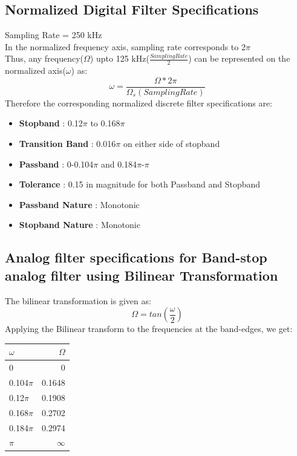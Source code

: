 \documentclass[12pt]{article}
\begin{document}
\subsection{Normalized Digital Filter Specifications}
Sampling Rate = 250 kHz\\
In the normalized frequency axis, sampling rate corresponds to 2$\pi$ \\
Thus, any frequency($\Omega$) upto 125 kHz($\frac{Sampling Rate}{2}$) can be represented on the normalized axis($\omega$) as:
\begin{equation*}
\omega = \frac{\Omega*2\pi}{\Omega _{s}(Sampling Rate)}
\end{equation*}
Therefore the corresponding normalized discrete filter specifications are:
\begin{itemize}
\item \textbf{Stopband} : 0.12$\pi$ to 0.168$\pi$
\item \textbf{Transition Band} : 0.016$\pi$ on either side of stopband
\item \textbf{Passband} : 0-0.104$\pi$ and 0.184$\pi$-$\pi$
\item \textbf{Tolerance} : 0.15 in magnitude for both Passband and Stopband
\item \textbf{Passband Nature} : Monotonic
\item \textbf{Stopband Nature} : Monotonic
\end{itemize}
\subsection{Analog filter specifications for Band-stop analog filter using Bilinear Transformation}
The bilinear transformation is given as:
\begin{equation*}
\Omega = tan\left(\frac{\omega}{2}\right)
\end{equation*}
Applying the Bilinear transform to the frequencies at the band-edges, we get:
\begin{table}[h!]
\centering
\begin{tabular}{|l|r|}\hline
$\omega$ & $\Omega$ \\\hline
0 & 0 \\
0.104$\pi$ & 0.1648 \\             
0.12$\pi$ & 0.1908 \\
0.168$\pi$ & 0.2702  \\
0.184$\pi$ & 0.2974 \\
$\pi$ & $\infty$\\ \hline
\end{tabular}
\end{table}
\end{document}

